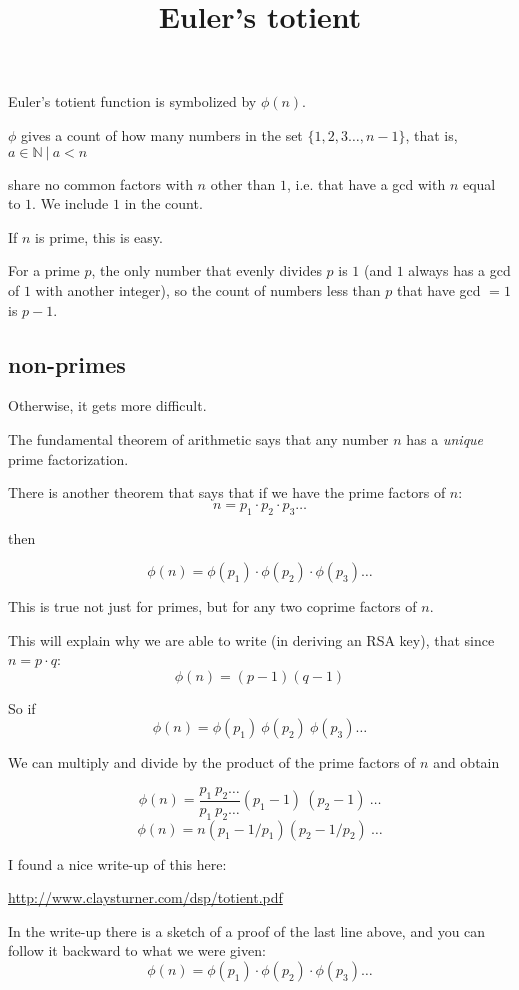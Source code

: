 \documentclass[11pt, oneside]{article}
\title{Euler's totient}
\date{}
\begin{document}
\maketitle
\Large

Euler's totient function is symbolized by $\phi(n)$.

$\phi$ gives a count of how many numbers in the set $ \{ 1, 2, 3 \dots , n-1 \}$, that is, $a \in \mathbb{N} \ | \ a < n$

share no common factors with $n$ other than $1$, i.e. that have a gcd with $n$ equal to $1$.  We include $1$ in the count.

If $n$ is prime, this is easy.  

For a prime $p$, the only number that evenly divides $p$ is $1$ (and $1$ always has a gcd of $1$ with another integer), so the count of numbers less than $p$ that have gcd $= 1$ is $p - 1$.

\subsection*{non-primes}

Otherwise, it gets more difficult.  

The fundamental theorem of arithmetic says that any number $n$ has a \emph{unique} prime factorization.

There is another theorem that says that if we have the prime factors of $n$:
\[ n = p_1 \cdot p_2 \cdot p_3 \dots \]
    
then

\[ \phi(n) = \phi(p_1) \cdot \phi(p_2) \cdot \phi(p_3) \dots \]

This is true not just for primes, but for any two coprime factors of $n$.  

This will explain why we are able to write (in deriving an RSA key), that since $n = p \cdot q$:
\[ \phi(n) = (p-1)(q-1) \]

So if
\[ \phi(n) = \phi(p_1) \ \phi(p_2) \ \phi(p_3) \dots \]
    
We can multiply and divide by the product of the prime factors of $n$ and obtain

\[ \phi(n) = \frac{p_1 \ p_2 \dots}{p_1 \ p_2 \dots} (p_1 - 1) \ (p_2 - 1) \ \dots \]
\[ \phi(n) = n(p_1 - 1/p_1)(p_2 - 1/p_2) \ \dots \]

I found a nice write-up of this here:

\url{http://www.claysturner.com/dsp/totient.pdf}

In the write-up there is a sketch of a proof of the last line above, and you can follow it backward to what we were given:
\[ \phi(n) = \phi(p_1) \cdot \phi(p_2) \cdot \phi(p_3) \dots \]
\end{document}
